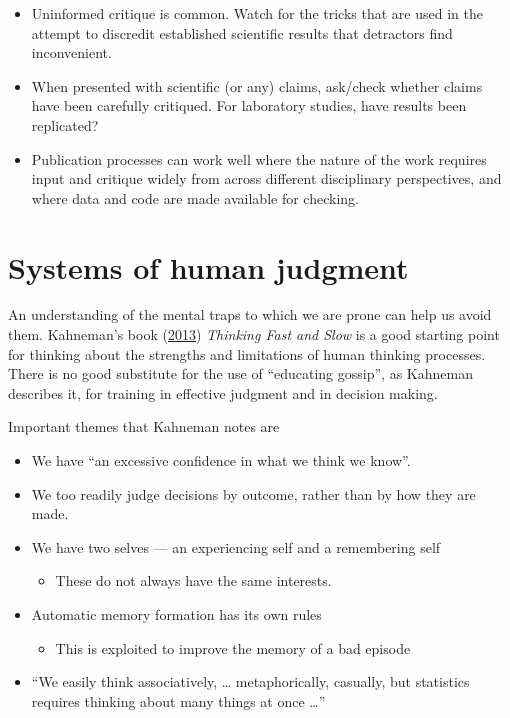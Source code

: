 \documentclass[
  10pt,
  b5paper]{book}
\providecommand{\tightlist}{%
  \setlength{\itemsep}{0pt}\setlength{\parskip}{0pt}}
\begin{document}
\begin{enumerate}
  \begin{itemize}
  \tightlist
  \item
    Uninformed critique is common. Watch for the
    tricks that are used in the attempt to discredit established
    scientific results that detractors find inconvenient.
  \item
    When presented with scientific (or any) claims, ask/check
    whether claims have been carefully critiqued. For laboratory
    studies, have results been replicated?
  \item
    Publication processes can work well where the nature of the
    work requires input and critique widely from across different
    disciplinary perspectives, and where data and code are made
    available for checking.
  \end{itemize}
\end{enumerate}

\mainmatter

\hypertarget{systems-of-human-judgment}{%
\chapter{Systems of human judgment}\label{systems-of-human-judgment}}

An understanding of the mental traps to which we are prone can help us avoid them. Kahneman's book (\protect\hyperlink{ref-kahneman_2013}{2013}) \emph{Thinking Fast and Slow} is a good starting point for thinking about the strengths and limitations of human thinking processes. There is no good substitute for the use of ``educating gossip'', as Kahneman describes it, for training in effective judgment and in decision making.

Important themes that Kahneman notes are

\begin{itemize}
\tightlist
\item
  We have ``an excessive confidence in what we think we know''.
\item
  We too readily judge decisions by outcome, rather than by how they are made.
\item
  We have two selves --- an experiencing self and a remembering self

  \begin{itemize}
  \tightlist
  \item
    These do not always have the same interests.
  \end{itemize}
\item
  Automatic memory formation has its own rules

  \begin{itemize}
  \tightlist
  \item
    This is exploited to improve the memory of a bad episode
  \end{itemize}
\item
  ``We easily think associatively, \ldots{} metaphorically, casually, but statistics requires thinking about many things at once \ldots{}''
\end{itemize}
\end{document}
